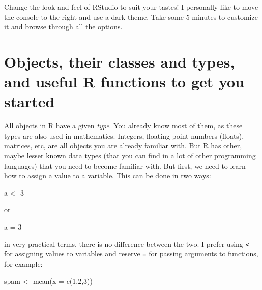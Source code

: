 \documentclass[
]{article}
\newenvironment{Shaded}{\begin{snugshade}}{\end{snugshade}}
\newcommand{\AttributeTok}[1]{\textcolor[rgb]{0.77,0.63,0.00}{#1}}
\newcommand{\DecValTok}[1]{\textcolor[rgb]{0.00,0.00,0.81}{#1}}
\newcommand{\FunctionTok}[1]{\textcolor[rgb]{0.00,0.00,0.00}{#1}}
\newcommand{\NormalTok}[1]{#1}
\newcommand{\OtherTok}[1]{\textcolor[rgb]{0.56,0.35,0.01}{#1}}
\begin{document}
Change the look and feel of RStudio to suit your tastes! I personally like to move the console
to the right and use a dark theme. Take some 5 minutes to customize it and browse through all the options.

\hypertarget{objects-their-classes-and-types-and-useful-r-functions-to-get-you-started}{%
\section{Objects, their classes and types, and useful R functions to get you started}\label{objects-their-classes-and-types-and-useful-r-functions-to-get-you-started}}

All objects in R have a given \emph{type}. You already know most of them, as these types are also used
in mathematics. Integers, floating point numbers (floats), matrices, etc, are all objects you
are already familiar with. But R has other, maybe lesser known data types (that you can find in a
lot of other programming languages) that you need to become familiar with. But first, we need to
learn how to assign a value to a variable. This can be done in two ways:

\begin{Shaded}
\begin{Highlighting}[]
\NormalTok{a }\OtherTok{\textless{}{-}} \DecValTok{3}
\end{Highlighting}
\end{Shaded}

or

\begin{Shaded}
\begin{Highlighting}[]
\NormalTok{a }\OtherTok{=} \DecValTok{3}
\end{Highlighting}
\end{Shaded}

in very practical terms, there is no difference between the two. I prefer using \texttt{\textless{}-} for assigning
values to variables and reserve \texttt{=} for passing arguments to functions, for example:

\begin{Shaded}
\begin{Highlighting}[]
\NormalTok{spam }\OtherTok{\textless{}{-}} \FunctionTok{mean}\NormalTok{(}\AttributeTok{x =} \FunctionTok{c}\NormalTok{(}\DecValTok{1}\NormalTok{,}\DecValTok{2}\NormalTok{,}\DecValTok{3}\NormalTok{))}
\end{Highlighting}
\end{Shaded}
\end{document}
